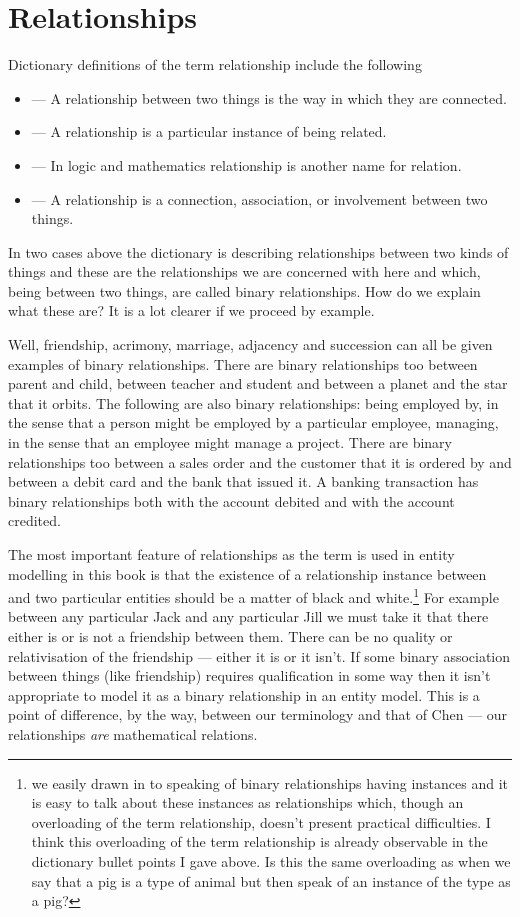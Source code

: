 \section{Relationships}
\mynote Dictionary definitions of the term relationship include the following
\begin{itemize}
\item --- A relationship between two things is the way in which they are connected.
\item --- A relationship is a particular instance of being related.
\item --- In logic and mathematics relationship is another name for relation.
\item --- A relationship is a connection, association, or involvement between two things.
\end{itemize}

\mynote In two cases above the dictionary is describing relationships between two kinds of things and these are the relationships we are concerned with here and which, being between two things, are called binary relationships. How do we explain what these are? It is a lot clearer if we proceed by example.


\mynote
Well, friendship, acrimony, marriage, adjacency and succession can all be given examples of binary relationships. There are binary relationships too  between parent and child, between teacher and student and between a planet and the star that it orbits.   
The following are also binary relationships:
being employed by, in the sense that a person might be employed by a particular employee,
managing, in the sense that an employee might manage a project. There are binary relationships too between a sales order and the customer that it is ordered by and between a debit card and  the bank that issued it. A banking transaction has binary relationships both with the account debited and with the account credited. 

\mynote The most important feature of relationships as the term is used in entity modelling in this book is that the existence of a relationship instance between and two particular entities should be a matter of black and white.\footnote{we easily drawn in to speaking of binary relationships having instances and it is easy to talk about these instances as relationships which, though an overloading of the term relationship, doesn't present practical difficulties.
I think this overloading of the term relationship is already observable in the dictionary bullet points I gave above. Is this the same overloading as when we say that a pig is a type of animal but then speak of an instance of the type as a pig?} For example between any particular Jack and any particular Jill we must take it that there either is or is not a friendship between them. There can be no quality or relativisation of the friendship --- either it is or it isn't. If some binary association between things
(like friendship)  requires qualification in some way then it isn't appropriate to model it as a binary relationship in an entity model. This is a point of difference, by the way, between our terminology and that of Chen --- our relationships \textit{are} mathematical relations. 

